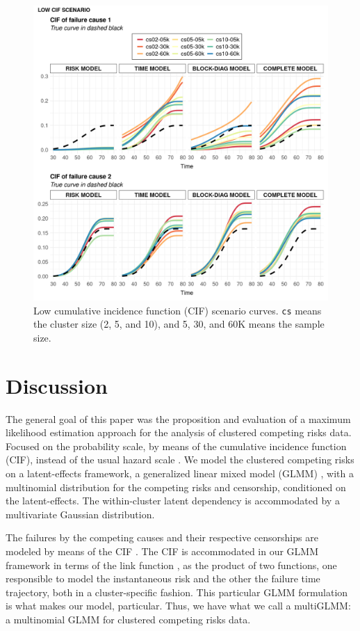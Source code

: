 \documentclass[a4paper,12pt]{article}
\begin{document}
\begin{figure}[H]
 \centering
 \includegraphics[width=\linewidth]{pics/cifs-2.png}
 \vspace{-0.75cm}
 \caption{Low cumulative incidence function (CIF) scenario
   curves. \texttt{cs} means the cluster size (2, 5, and 10), and 5, 30,
   and 60K means the sample size.}
 \label{fig:cifslow}
\end{figure}

\section{Discussion}
\label{discussion}

The general goal of this paper was the proposition and evaluation of a
maximum likelihood estimation approach for the analysis of clustered
competing risks data. Focused on the probability scale, by means of the
cumulative incidence function (CIF), instead of the usual hazard scale
\citep{kalb&prentice}. We model the clustered competing risks on a
latent-effects framework, a generalized linear mixed model (GLMM)
\citep{GLMM}, with a multinomial distribution for the competing risks
and censorship, conditioned on the latent-effects. The within-cluster
latent dependency is accommodated by a multivariate Gaussian
distribution.

The failures by the competing causes and their respective censorships
are modeled by means of the CIF \citep{kalb&prentice,andersen12}. The
CIF is accommodated in our GLMM framework in terms of the link function
\citep{GLM89}, as the product of two functions, one responsible to model
the instantaneous risk and the other the failure time trajectory, both
in a cluster-specific fashion. This particular GLMM formulation is what
makes our model, particular. Thus, we have what we call a multiGLMM: a
multinomial GLMM for clustered competing risks data.
\end{document}
